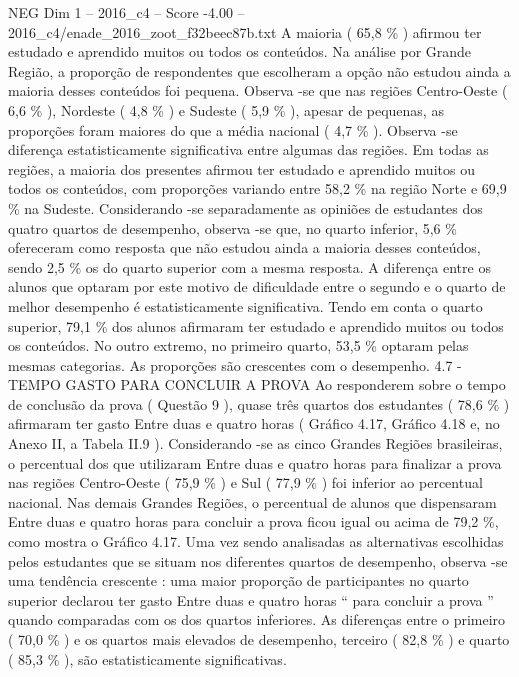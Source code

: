 \begin{textsample}{NEG Dim 1 – 2016\_c4 – Score -4.00 – 2016\_c4/enade\_2016\_zoot\_f32beec87b.txt}
A maioria ( 65,8 \% ) afirmou ter estudado e aprendido muitos ou todos os conteúdos.
Na análise por Grande Região, a proporção de respondentes que escolheram a opção não estudou ainda a maioria desses conteúdos foi pequena.
Observa -se que nas regiões Centro-Oeste ( 6,6 \% ), Nordeste ( 4,8 \% ) e Sudeste ( 5,9 \% ), apesar de pequenas, as proporções foram maiores do que a média nacional ( 4,7 \% ).
Observa -se diferença estatisticamente significativa entre algumas das regiões.
Em todas as regiões, a maioria dos presentes afirmou ter estudado e aprendido muitos ou todos os conteúdos, com proporções variando entre 58,2 \% na região Norte e 69,9 \% na Sudeste.
Considerando -se separadamente as opiniões de estudantes dos quatro quartos de desempenho, observa -se que, no quarto inferior, 5,6 \% ofereceram como resposta que não estudou ainda a maioria desses conteúdos, sendo 2,5 \% os do quarto superior com a mesma resposta.
A diferença entre os alunos que optaram por este motivo de dificuldade entre o segundo e o quarto de melhor desempenho é estatisticamente significativa.
Tendo em conta o quarto superior, 79,1 \% dos alunos afirmaram ter estudado e aprendido muitos ou todos os conteúdos.
No outro extremo, no primeiro quarto, 53,5 \% optaram pelas mesmas categorias.
As proporções são crescentes com o desempenho. 4.7 - TEMPO GASTO PARA CONCLUIR A PROVA Ao responderem sobre o tempo de conclusão da prova ( Questão 9 ), quase três quartos dos estudantes ( 78,6 \% ) afirmaram ter gasto Entre duas e quatro horas ( Gráfico 4.17, Gráfico 4.18 e, no Anexo II, a Tabela II.9 ).
Considerando -se as cinco Grandes Regiões brasileiras, o percentual dos que utilizaram Entre duas e quatro horas para finalizar a prova nas regiões Centro-Oeste ( 75,9 \% ) e Sul ( 77,9 \% ) foi inferior ao percentual nacional.
Nas demais Grandes Regiões, o percentual de alunos que dispensaram Entre duas e quatro horas para concluir a prova ficou igual ou acima de 79,2 \%, como mostra o Gráfico 4.17.
Uma vez sendo analisadas as alternativas escolhidas pelos estudantes que se situam nos diferentes quartos de desempenho, observa -se uma tendência crescente : uma maior proporção de participantes no quarto superior declarou ter gasto Entre duas e quatro horas “ para concluir a prova ” quando comparadas com os dos quartos inferiores.
As diferenças entre o primeiro ( 70,0 \% ) e os quartos mais elevados de desempenho, terceiro ( 82,8 \% ) e quarto ( 85,3 \% ), são estatisticamente significativas.

\end{textsample}
